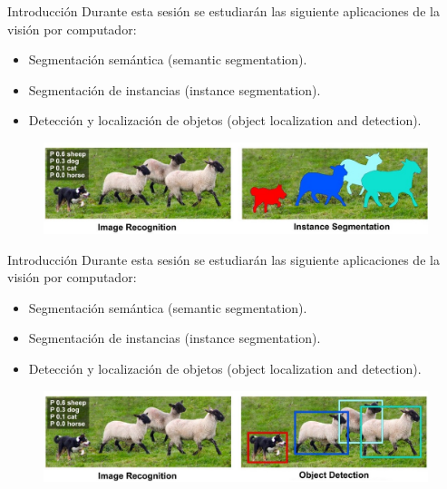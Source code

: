 \begin{frame}{Introducción}
Durante esta sesión se estudiarán las siguiente aplicaciones de la visión por computador:
\begin{itemize}
    \item Segmentación semántica (semantic segmentation).
    \item \alert{Segmentación de instancias} (instance segmentation).
    \item Detección y localización de objetos (object localization and detection).
\end{itemize}

\begin{figure}
    \centering
    \includegraphics[width=\textwidth]{Slides/figures/Tema 4/InstanceSeg.jpg}
    \caption{\cite{InstanceSeg}}
\end{figure}
\end{frame}

\begin{frame}{Introducción}
Durante esta sesión se estudiarán las siguiente aplicaciones de la visión por computador:
\begin{itemize}
    \item Segmentación semántica (semantic segmentation).
    \item Segmentación de instancias (instance segmentation).
    \item \alert{Detección y localización de objetos} (object localization and detection).
\end{itemize}

\begin{figure}
    \centering
    \includegraphics[width=\textwidth]{Slides/figures/Tema 4/ObjectDet.jpg}
    \caption{\cite{ObjectDet}}
\end{figure}
\end{frame}


